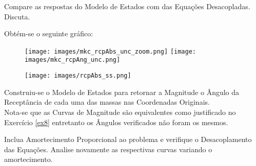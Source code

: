 \documentclass{article}
\begin{document}
\newpage\begin{exercise}\label{ex11}
    Compare as respostas do Modelo de Estados com das Equações Desacopladas. Discuta.
\end{exercise}
\begin{resolution}
    Obtém-se o seguinte gráfico:
    \begin{figure}[H]
        \centering
        \texttt{[image: images/mkc\_rcpAbs\_unc\_zoom.png]}
        \texttt{[image: images/mkc\_rcpAng\_unc.png]}
    \end{figure}
    \begin{figure}[H]
        \centering
        \texttt{[image: images/rcpAbs\_ss.png]}
    \end{figure}
    Construiu-se o Modelo de Estados para retornar a Magnitude o Ângulo da Receptância de cada uma das massas nas Coordenadas Originais.\\

    Nota-se que as Curvas de Magnitude são equivalentes como justificado no Exercício \ref{ex8} entretanto os Ângulos verificados não foram os mesmos.
\end{resolution}


\newpage\begin{exercise}\label{ex12}
    Inclua Amortecimento Proporcional ao problema e verifique o Desacoplamento das Equações. Analise novamente as respectivas curvas variando o amortecimento.
\end{exercise}
\begin{resolution}
    
\end{resolution}
\end{document}
